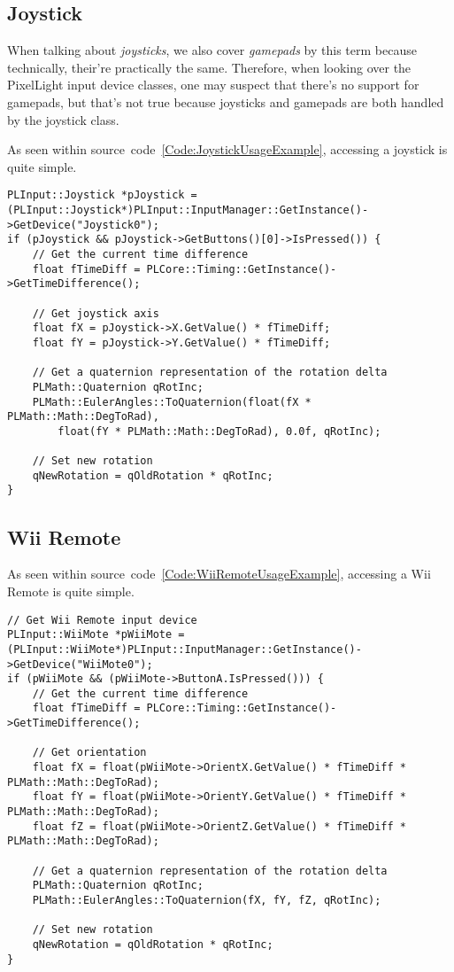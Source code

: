 \subsection{Joystick}
When talking about \emph{joysticks}, we also cover \emph{gamepads} by this term because technically, their're practically the same. Therefore, when looking over the PixelLight input device classes, one may suspect that there's no support for gamepads, but that's not true because joysticks and gamepads are both handled by the joystick class.

As seen within source~code~\ref{Code:JoystickUsageExample}, accessing a joystick is quite simple.
\begin{lstlisting}[float=htb,label=Code:JoystickUsageExample,caption={Joystick usage example}]
PLInput::Joystick *pJoystick = (PLInput::Joystick*)PLInput::InputManager::GetInstance()->GetDevice("Joystick0");
if (pJoystick && pJoystick->GetButtons()[0]->IsPressed()) {
	// Get the current time difference
	float fTimeDiff = PLCore::Timing::GetInstance()->GetTimeDifference();

	// Get joystick axis
	float fX = pJoystick->X.GetValue() * fTimeDiff;
	float fY = pJoystick->Y.GetValue() * fTimeDiff;

	// Get a quaternion representation of the rotation delta
	PLMath::Quaternion qRotInc;
	PLMath::EulerAngles::ToQuaternion(float(fX * PLMath::Math::DegToRad),
		float(fY * PLMath::Math::DegToRad), 0.0f, qRotInc);

	// Set new rotation
	qNewRotation = qOldRotation * qRotInc;
}
\end{lstlisting}




\subsection{Wii Remote}
As seen within source~code~\ref{Code:WiiRemoteUsageExample}, accessing a Wii Remote is quite simple.
\begin{lstlisting}[float=htb,label=Code:WiiRemoteUsageExample,caption={Wii Remote usage example}]
// Get Wii Remote input device
PLInput::WiiMote *pWiiMote = (PLInput::WiiMote*)PLInput::InputManager::GetInstance()->GetDevice("WiiMote0");
if (pWiiMote && (pWiiMote->ButtonA.IsPressed())) {
	// Get the current time difference
	float fTimeDiff = PLCore::Timing::GetInstance()->GetTimeDifference();

	// Get orientation
	float fX = float(pWiiMote->OrientX.GetValue() * fTimeDiff * PLMath::Math::DegToRad);
	float fY = float(pWiiMote->OrientY.GetValue() * fTimeDiff * PLMath::Math::DegToRad);
	float fZ = float(pWiiMote->OrientZ.GetValue() * fTimeDiff * PLMath::Math::DegToRad);

	// Get a quaternion representation of the rotation delta
	PLMath::Quaternion qRotInc;
	PLMath::EulerAngles::ToQuaternion(fX, fY, fZ, qRotInc);

	// Set new rotation
	qNewRotation = qOldRotation * qRotInc;
}
\end{lstlisting}





